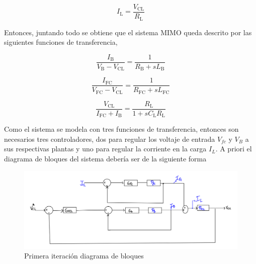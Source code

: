 \begin{equation}
    I_{\text{L}} = \frac{V_{\text{CL}}}{R_{\text{L}}}
\end{equation}

Entonces, juntando todo se obtiene que el sistema MIMO queda descrito por las siguientes funciones de transferencia,

\begin{equation}\label{Funcion de transferencia batería interno}
    \frac{I_{\text{B}}}{V_{\text{B}}- V_{\text{CL}}}=\frac{1}{R_{\text{B}} + sL_{\text{B}}} 
\end{equation}

\begin{equation}\label{Funcion de transferencia fuel cell}
    \frac{I_{\text{FC}}}{V_{\text{FC}}- V_{\text{CL}}}=\frac{1}{R_{\text{FC}} +sL_{\text{FC}}} 
\end{equation}

\begin{equation}\label{Funcion de transferencia batería externo}
    \frac{V_{\text{CL}}}{I_{\text{FC}}+I_{\text{B}}}=\frac{R_{\text{L}}}{1+sC_{\text{L}}R_{\text{L}}}
\end{equation}


Como el sistema se modela con tres funciones de transferencia, entonces son necesarios tres controladores, dos para regular los voltaje de entrada $V_{fc}$ y $V_{B}$ a sus respectivas plantas y uno para regular la corriente en la carga $I_L$. A priori el diagrama de bloques del sistema debería ser de la siguiente forma  
\begin{figure}[htbp]
    \centering
    \includegraphics[width=0.9\linewidth]{img/Diagrama de bloques 1.png}
    \caption{Primera iteración diagrama de bloques}
    \label{fig:Diagrama de bloques 1}
\end{figure}

